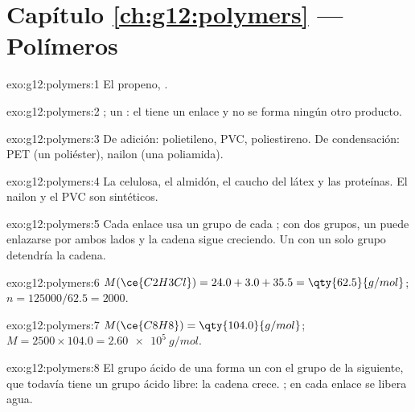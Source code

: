 \section*{Capítulo \ref{ch:g12:polymers} --- Polímeros}

\begin{solution}{exo:g12:polymers:1}
El propeno, .
\end{solution}

\begin{solution}{exo:g12:polymers:2}
; un : el  tiene un enlace
 y no se forma ningún otro producto.
\end{solution}

\begin{solution}{exo:g12:polymers:3}
De adición: polietileno, PVC, poliestireno. De condensación: PET (un
poliéster), nailon (una poliamida).
\end{solution}

\begin{solution}{exo:g12:polymers:4}
La celulosa, el almidón, el caucho del látex y las proteínas. El nailon y
el PVC son sintéticos.
\end{solution}

\begin{solution}{exo:g12:polymers:5}
Cada enlace usa un grupo de cada ; con dos grupos, un 
puede enlazarse por ambos lados y la cadena sigue creciendo. Un 
con un solo grupo detendría la cadena.
\end{solution}

\begin{solution}{exo:g12:polymers:6}
$M(\ce{C2H3Cl}) = 24.0 + 3.0 + 35.5 = \qty{62.5}{g/mol}$;
$n = 125000/62.5 = 2000$.
\end{solution}

\begin{solution}{exo:g12:polymers:7}
$M(\ce{C8H8}) = \qty{104.0}{g/mol}$; $M = 2500 \times 104.0 =
\qty{2.60e5}{g/mol}$.
\end{solution}

\begin{solution}{exo:g12:polymers:8}
El grupo ácido de una  forma un  con el grupo  de la
siguiente, que todavía tiene un grupo ácido libre: la cadena crece.
 ; en cada enlace se libera agua.
\end{solution}

